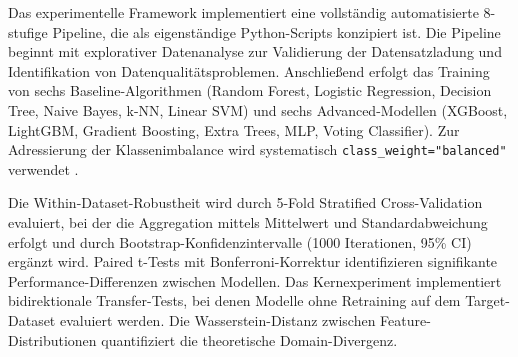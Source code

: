 \documentclass[11pt,a4paper]{article}
\begin{document}

    Das experimentelle Framework implementiert eine vollständig automatisierte 8-stufige Pipeline, die als eigenständige Python-Scripts konzipiert ist. Die Pipeline beginnt mit explorativer Datenanalyse zur Validierung der Datensatzladung und Identifikation von Datenqualitätsproblemen. Anschließend erfolgt das Training von sechs Baseline-Algorithmen (Random Forest, Logistic Regression, Decision Tree, Naive Bayes, k-NN, Linear SVM) und sechs Advanced-Modellen (XGBoost, LightGBM, Gradient Boosting, Extra Trees, MLP, Voting Classifier). Zur Adressierung der Klassenimbalance wird systematisch \texttt{class\_weight="balanced"} verwendet \parencite{Hastie2009,Vinayakumar2019}.

    Die Within-Dataset-Robustheit wird durch 5-Fold Stratified Cross-Validation evaluiert, bei der die Aggregation mittels Mittelwert und Standardabweichung erfolgt und durch Bootstrap-Konfidenzintervalle (1000 Iterationen, 95\% CI) ergänzt wird. Paired t-Tests mit Bonferroni-Korrektur identifizieren signifikante Performance-Differenzen zwischen Modellen. Das Kernexperiment implementiert bidirektionale Transfer-Tests, bei denen Modelle ohne Retraining auf dem Target-Dataset evaluiert werden. Die Wasserstein-Distanz zwischen Feature-Distributionen quantifiziert die theoretische Domain-Divergenz.
\end{document}
